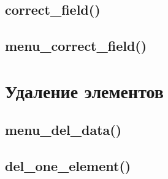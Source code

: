 \documentclass[12pt, a4paper]{article}
\begin{document}

\subsection{correct\_field()}






\subsection{menu\_correct\_field()}






\section{Удаление элементов}


\subsection{menu\_del\_data()}






\subsection{del\_one\_element()}




\end{document}
